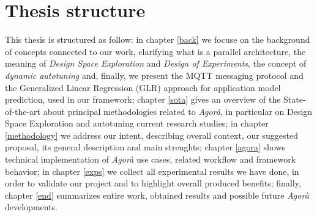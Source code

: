 \section{Thesis structure}

This thesis is structured as follow: in chapter \ref{back} we focuse on the background of concepts connected to our work, clarifying what is a parallel architecture, the meaning of \textit{Design Space Exploration} and \textit{Design of Experiments}, the concept of \textit{dynamic autotuning} and, finally, we present the MQTT messaging protocol and the Generalized Linear Regression (GLR) approach for application model prediction, used in our framework; chapter \ref{sota} gives an overview of the State-of-the-art about principal methodologies related to \textit{Agorà}, in particular on Design Space Exploration and autotuning current research studies; in chapter \ref{methodology} we address our intent, describing overall context, our suggested proposal, its general description and main strenghts; chapter \ref{agora} shows technical implementation of \textit{Agorà} use cases, related workflow and framework behavior; in chapter \ref{exps} we collect all experimental results we have done, in order to validate our project and to highlight overall produced benefits; finally, chapter \ref{end} summarizes entire work, obtained results and possible future \textit{Agorà} developments.
